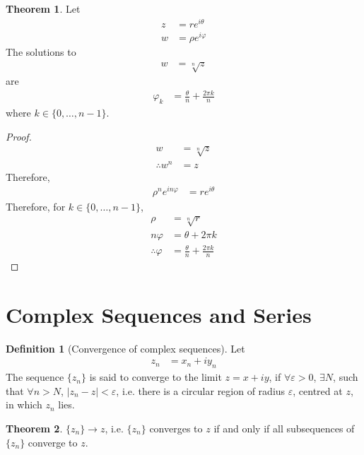 \documentclass[titlepage, fleqn, a4paper, 12pt, twoside]{article}
\theoremstyle{definition}
\newtheorem{definition}{Definition}
\theoremstyle{theorem}
\newtheorem{theorem}{Theorem}
\begin{document}
\begin{theorem}
	Let
	\begin{align*}
		z & = r e^{i \theta} \\
		w & = \rho e^{i \varphi}
	\end{align*}
	The solutions to
	\begin{align*}
		w & = \sqrt[n]{z}
	\end{align*}
	are
	\begin{align*}
		\varphi_k & = \frac{\theta}{n} + \frac{2 \pi k}{n}
	\end{align*}
	where $k \in \{0,\dots,n - 1\}$.
\end{theorem}

\begin{proof}
	\begin{align*}
		w              & = \sqrt[n]{z} \\
		\therefore w^n & = z
	\end{align*}
	Therefore,
	\begin{align*}
		\rho^n e^{i n \varphi} & = r e^{i \theta}
	\end{align*}
	Therefore, for $k \in \{0,\dots,n - 1\}$,
	\begin{align*}
		\rho               & = \sqrt[n]{r}      \\
		n \varphi          & = \theta + 2 \pi k \\
		\therefore \varphi & = \frac{\theta}{n} + \frac{2 \pi k}{n}
	\end{align*}
\end{proof}

\newpage
\part{Complex Sequences and Series}

\begin{definition}[Convergence of complex sequences]
	Let
	\begin{align*}
		z_n & = x_n + i y_n
	\end{align*}
	The sequence $\{z_n\}$ is said to converge to the limit $z = x + i y$, if $\forall \varepsilon > 0$, $\exists N$, such that $\forall n > N$, $|z_n - z| < \varepsilon$, i.e. there is a circular region of radius $\varepsilon$, centred at $z$, in which $z_n$ lies.
\end{definition}

\begin{theorem}
	$\{z_n\} \to z$, i.e. $\{z_n\}$ converges to $z$ if and only if all subsequences of $\{z_n\}$ converge to $z$.
\end{theorem}
\end{document}
